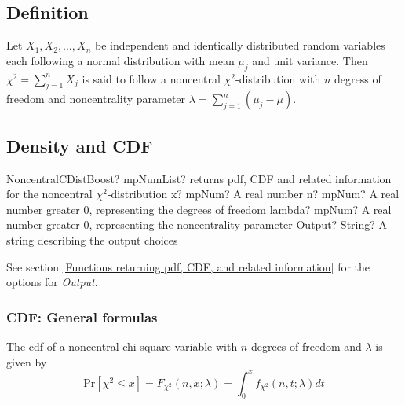 \subsection{Definition}
\label{NoncentralChiSquareDistributionDefinitionBoost}

Let $X_1, X_2, \ldots, X_n$ be independent and identically distributed random variables each following a normal distribution with mean $\mu_j$ and unit variance. 
Then $\chi^2 = \sum_{j=1}^n X_j$ is said to follow a noncentral $\chi^2$-distribution with $n$ degress of freedom and noncentrality parameter \mbox{$\lambda = \sum_{j=1}^n (\mu_j - \mu)$.} 


\subsection{Density and CDF}

\begin{mpFunctionsExtract}
	\mpFunctionFour
	{NoncentralCDistBoost? mpNumList? returns pdf, CDF and related information for the noncentral $\chi^2$-distribution}
	{x? mpNum? A real number}
	{n? mpNum? A real number greater 0, representing the degrees of freedom}
	{lambda? mpNum? A real number greater 0, representing the noncentrality parameter}
	{Output? String? A string describing the output choices}
\end{mpFunctionsExtract}


\vspace{0.3cm}
See section \ref{Functions returning pdf, CDF, and related information} for the options for {\itshape\sffamily Output}. 




\label{NoncentralChiSquareDistributionDensityBoost}



\subsubsection{CDF: General formulas}
\label{NoncentralChiSquareDistributionCDFBoost}

The cdf of a noncentral chi-square variable with $n$ degrees of freedom and $\lambda$ is given by
\begin{equation}
	\text{Pr}\left[\chi^2 \le x\right] = F_{\chi^2}\left(n, x; \lambda\right) =  \int_{0}^{x} f_{\chi^2}\left(n, t; \lambda\right) dt
\end{equation} 

